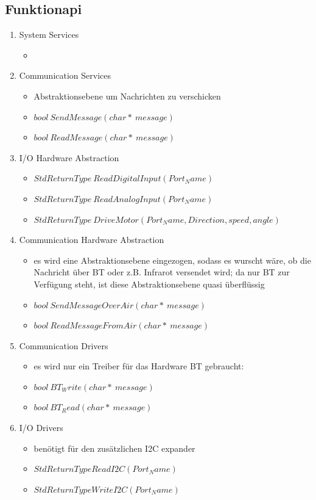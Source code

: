 \documentclass[a4paper,11pt]{scrreprt}
\begin{document}
\subsection{Funktionapi}
\begin{enumerate}[1.)]
\item System Services
	\begin{itemize}
	\item 
	\end{itemize}
\item Communication Services
	\begin{itemize}
	\item Abstraktionsebene um Nachrichten zu verschicken
	\item $bool~SendMessage(char*~message)$
	\item $bool~ReadMessage(char*~message)$
	\end{itemize}
\item I/O Hardware Abstraction
	\begin{itemize}
	\item $StdReturnType~ReadDigitalInput(Port_Name)$
	\item $StdReturnType~ReadAnalogInput(Port_Name)$
	\item $StdReturnType~DriveMotor(Port_Name, Direction, speed, angle)$
	\end{itemize}
\item Communication Hardware Abstraction
	\begin{itemize}
	\item es wird eine Abstraktionsebene eingezogen, sodass es wurscht wäre, ob die Nachricht über BT oder z.B. Infrarot versendet wird; da nur BT zur Verfügung steht, ist diese Abstraktionsebene quasi überflüssig
	\item $bool~SendMessageOverAir(char*~message)$
	\item $bool~ReadMessageFromAir(char*~message)$
	\end{itemize}
\item Communication Drivers
	\begin{itemize}
	\item es wird nur ein Treiber für das Hardware BT gebraucht:
	\item $bool~BT_Write(char*~message)$ 
	\item $bool~BT_Read(char*~message)$
	\end{itemize}
\item I/O Drivers
	\begin{itemize}
	\item benötigt für den zusätzlichen I2C expander
	\item $StdReturnType ReadI2C(Port_Name)$
	\item $StdReturnType WriteI2C(Port_Name)$
	
	\end{itemize}
\end{enumerate}
\end{document}
